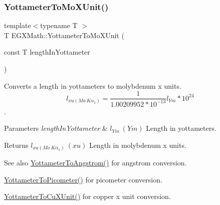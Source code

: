 \subsubsection{\texorpdfstring{Yottameter\+To\+Mo\+X\+Unit()}{YottameterToMoXUnit()}}
{\footnotesize\ttfamily template$<$typename T $>$ \\
T E\+G\+X\+Math\+::\+Yottameter\+To\+Mo\+X\+Unit (\begin{DoxyParamCaption}\item[{const T}]{length\+In\+Yottameter }\end{DoxyParamCaption})}



Converts a length in yottameters to molybdenum x units. \[ l_{xu(Mo\ K\alpha_1)}=\frac{1}{1.00209952*10^{-13}} l_{Ym} * 10^{24}\]. 


\begin{DoxyParams}{Parameters}
{\em length\+In\+Yottameter} & $ l_{Ym}\ (Ym)$ Length in yottameters. \\
\hline
\end{DoxyParams}
\begin{DoxyReturn}{Returns}
$ l_{xu(Mo\ K\alpha_1)}\ (xu)$ Length in molybdenum x units. 
\end{DoxyReturn}
\begin{DoxySeeAlso}{See also}
\mbox{\hyperlink{group___e_g_x_math-_conversions-_length_conversions-_s_i-_yottameter-_non-_s_i_ga0129b788ceb2d7d4ce86c155ee9d4675}{Yottameter\+To\+Angstrom()}} for angstrom conversion. 

\mbox{\hyperlink{group___e_g_x_math-_conversions-_length_conversions-_s_i-_yottameter-_s_i_ga7af9d1314de06921546f079641c033b2}{Yottameter\+To\+Picometer()}} for picometer conversion. 

\mbox{\hyperlink{group___e_g_x_math-_conversions-_length_conversions-_s_i-_yottameter-_non-_s_i_ga5c8a9868ad238225dbf8ebdbfad13930}{Yottameter\+To\+Cu\+X\+Unit()}} for copper x unit conversion. 
\end{DoxySeeAlso}
